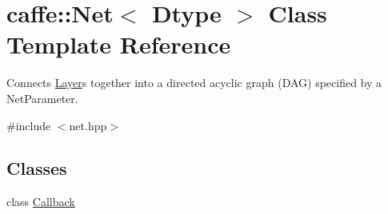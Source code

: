 \hypertarget{classcaffe_1_1Net}{}\section{caffe\+:\+:Net$<$ Dtype $>$ Class Template Reference}
\label{classcaffe_1_1Net}


Connects \hyperlink{classcaffe_1_1Layer}{Layer}s together into a directed acyclic graph (D\+AG) specified by a Net\+Parameter.  




{\ttfamily \#include $<$net.\+hpp$>$}

\subsection*{Classes}
\begin{DoxyCompactItemize}
\item 
class \hyperlink{classcaffe_1_1Net_1_1Callback}{Callback}
\end{DoxyCompactItemize}
